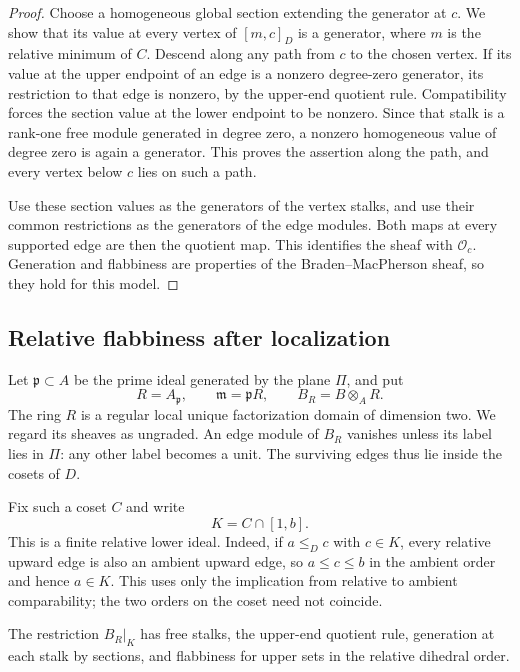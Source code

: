 \begin{proof}
Choose a homogeneous global section extending the generator at $c$.
We show that its value at every vertex of $[m,c]_D$ is a generator, where
$m$ is the relative minimum of $C$.  Descend along any path from $c$ to
the chosen vertex.  If its value at the upper endpoint of an edge is a
nonzero degree-zero generator, its restriction to that edge is nonzero,
by the upper-end quotient rule.  Compatibility forces the section value
at the lower endpoint to be nonzero.  Since that stalk is a rank-one
free module generated in degree zero, a nonzero homogeneous value of
degree zero is again a generator.  This proves the assertion along the
path, and every vertex below $c$ lies on such a path.

Use these section values as the generators of the vertex stalks, and
use their common restrictions as the generators of the edge modules.
Both maps at every supported edge are then the quotient map.  This
identifies the sheaf with $\mathcal O_c$.  Generation and flabbiness are
properties of the Braden--MacPherson sheaf, so they hold for this model.
\end{proof}

\subsection{Relative flabbiness after localization}

Let $\mathfrak p\subset A$ be the prime ideal generated by the plane
$\Pi$, and put
\[
 R=A_{\mathfrak p},\qquad
 \mathfrak m=\mathfrak pR,\qquad
 B_R=B\otimes_A R.
\]
The ring $R$ is a regular local unique factorization domain of dimension
two.  We regard its sheaves as ungraded.
An edge module of $B_R$ vanishes unless its label lies in
$\Pi$: any other label becomes a unit.  The surviving edges thus lie
inside the cosets of $D$.

Fix such a coset $C$ and write
\[
 K=C\cap[1,b].
\]
This is a finite relative lower ideal.  Indeed, if $a\le_D c$ with
$c\in K$, every relative upward edge is also an ambient upward edge,
so $a\le c\le b$ in the ambient order and hence $a\in K$.
This uses only the implication from relative to ambient comparability;
the two orders on the coset need not coincide.

\begin{lemma}
\label{loc:relative-flabbiness}
The restriction $B_R|_K$ has free stalks, the upper-end quotient
rule, generation at each stalk by sections, and flabbiness for upper
sets in the relative dihedral order.
\end{lemma}

